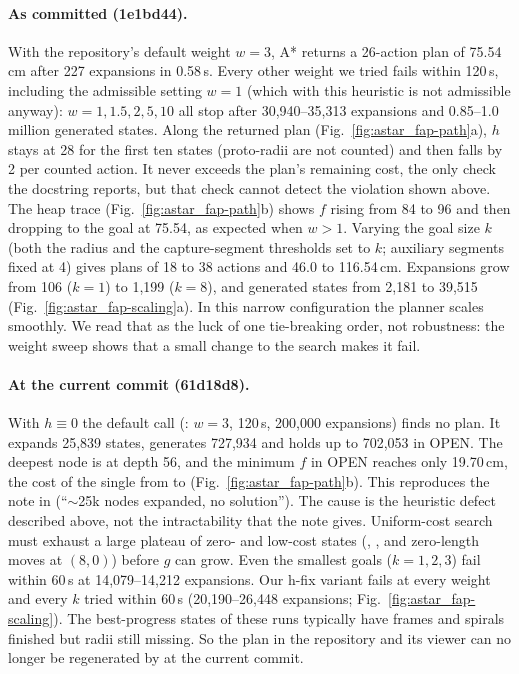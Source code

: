 \paragraph{As committed (1e1bd44).}
With the repository's default weight $w=3$, A* returns a 26-action plan of 75.54\,cm after 227
expansions in 0.58\,s. Every other weight we tried fails within 120\,s, including the admissible
setting $w=1$ (which with this heuristic is not admissible anyway): $w=1, 1.5, 2, 5, 10$ all stop
after 30,940--35,313 expansions and 0.85--1.0 million generated states. Along the returned plan
(Fig.~\ref{fig:astar_fap-path}a), $h$ stays at 28 for the first ten states (proto-radii are not
counted) and then falls by 2 per counted action. It never exceeds the plan's remaining cost, the
only check the docstring reports, but that check cannot detect the violation shown above. The
heap trace (Fig.~\ref{fig:astar_fap-path}b) shows $f$ rising from 84 to 96 and then dropping to
the goal at 75.54, as expected when $w>1$. Varying the goal size $k$ (both the radius and the
capture-segment thresholds set to $k$; auxiliary segments fixed at 4) gives plans of 18 to 38
actions and 46.0 to 116.54\,cm. Expansions grow from 106 ($k=1$) to 1,199 ($k=8$), and generated
states from 2,181 to 39,515 (Fig.~\ref{fig:astar_fap-scaling}a). In this narrow configuration the
planner scales smoothly. We read that as the luck of one tie-breaking order, not robustness: the
weight sweep shows that a small change to the search makes it fail.

\paragraph{At the current commit (61d18d8).}
With $h\equiv 0$ the default call (: $w=3$, 120\,s, 200,000 expansions) finds no
plan. It expands 25,839 states, generates 727,934 and holds up to 702,053 in OPEN. The deepest node is at depth 56, and the minimum $f$ in OPEN reaches only 19.70\,cm,
the cost of the single  from  to 
(Fig.~\ref{fig:astar_fap-path}b). This reproduces the note in  (``$\sim$25k
nodes expanded, no solution''). The cause is the heuristic defect described above, not the
intractability that the note gives. Uniform-cost search must exhaust a large plateau of zero- and
low-cost states (, ,  and
zero-length moves at $(8,0)$) before $g$ can grow. Even the smallest goals ($k=1,2,3$) fail within
60\,s at 14,079--14,212 expansions. Our h-fix variant fails at every weight and every $k$
tried within 60\,s (20,190--26,448 expansions; Fig.~\ref{fig:astar_fap-scaling}). The
best-progress states of these runs typically have frames and spirals finished but radii still
missing. So the plan in the repository and its viewer can no longer be regenerated by
 at the current commit.

